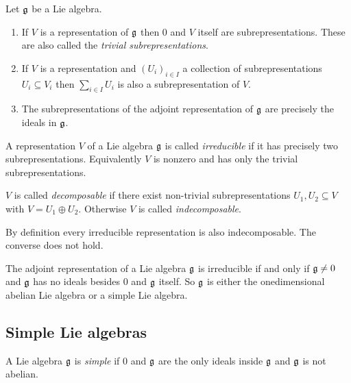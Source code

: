 \begin{expls}
 Let $\mathfrak{g}$ be a Lie algebra.
 \begin{enumerate}[leftmargin=*]
  \item
   If $V$ is a representation of $\mathfrak{g}$ then $0$ and $V$ itself are subrepresentations. These are also called the \emph{trivial subrepresentations}.
  \item
   If $V$ is a representation and $(U_i)_{i \in I}$ a collection of subrepresentations $U_i \subseteq V_i$ then $\sum_{i \in I} U_i$ is also a subrepresentation of $V$.
  \item
   The subrepresentations of the adjoint representation of $\mathfrak{g}$ are precisely the ideals in $\mathfrak{g}$.
 \end{enumerate}
\end{expls}


\begin{defi}
 A representation $V$ of a Lie algebra $\mathfrak{g}$ is called \emph{irreducible} if it has precisely two subrepresentations. Equivalently $V$ is nonzero and has only the trivial subrepresentations.
 
 $V$ is called \emph{decomposable} if there exist non-trivial subrepresentations $U_1, U_2 \subseteq V$ with $V = U_1 \oplus U_2$. Otherwise $V$ is called \emph{indecomposable}.
\end{defi}


\begin{rem}
 By definition every irreducible representation is also indecomposable. The converse does not hold.
\end{rem}



\begin{expl}
 The adjoint representation of a Lie algebra $\mathfrak{g}$ is irreducible if and only if $\mathfrak{g} \neq 0$ and $\mathfrak{g}$ has no ideals besides $0$ and $\mathfrak{g}$ itself. So $\mathfrak{g}$ is either the onedimensional abelian Lie algebra or a simple Lie algebra.
\end{expl}







\subsection{Simple Lie algebras}


\begin{defi}
 A Lie algebra $\mathfrak{g}$ is \emph{simple} if $0$ and $\mathfrak{g}$ are the only ideals inside $\mathfrak{g}$ and $\mathfrak{g}$ is not abelian.
\end{defi}


